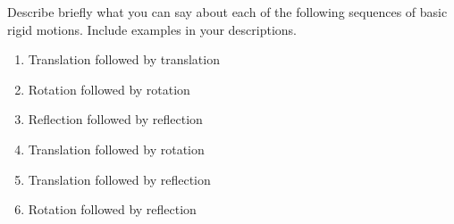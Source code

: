 \documentclass[nooutcomes,noauthor]{ximera}
\begin{document}
\begin{problem}
Describe briefly what you can say about each of the following
sequences of basic rigid motions.  Include examples in your
descriptions.
\begin{enumerate}
\item Translation followed by translation
\vspace{0.5in}
\item Rotation followed by rotation
\vspace{0.5in}
\item Reflection followed by reflection
\vspace{0.5in}
\item Translation followed by rotation
\vspace{0.5in}
\item Translation followed by reflection
\vspace{0.5in}
\item Rotation followed by reflection
\end{enumerate}
\end{problem}
\end{document}
